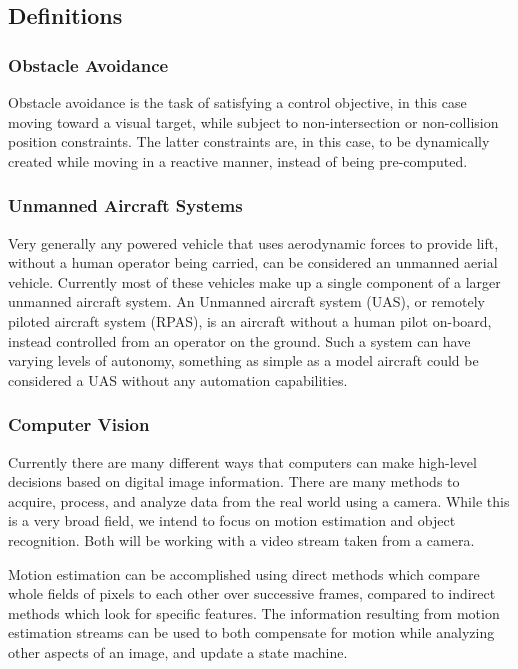 \documentclass{article}[12]
\begin{document}
	\subsection{Definitions}
	
		\subsubsection{Obstacle Avoidance}
		
		Obstacle avoidance is the task of satisfying a control objective, in this case moving toward a visual target, while subject to non-intersection or non-collision position constraints. The latter constraints are, in this case, to be dynamically created while moving in a reactive manner, instead of being pre-computed.
		
		\subsubsection{Unmanned Aircraft Systems}
		
		Very generally any powered vehicle that uses aerodynamic forces to provide lift, without a human operator being carried, can be considered an unmanned aerial vehicle. Currently most of these vehicles make up a single component of a larger unmanned aircraft system. An Unmanned aircraft system (UAS), or remotely piloted aircraft system (RPAS), is an aircraft without a human pilot on-board, instead controlled from an operator on the ground. Such a system can have varying levels of autonomy, something as simple as a model aircraft could be considered a UAS without any automation capabilities.\cite{RPAS}
		
		\subsubsection{Computer Vision}
		
		Currently there are many different ways that computers can make high-level decisions based on digital image information. There are many methods to acquire, process, and analyze data from the real world using a camera. While this is a very broad field, we intend to focus on motion estimation and object recognition. Both will be working with a video stream taken from a camera. 
		
		Motion estimation can be accomplished using direct methods which compare whole fields of pixels to each other over successive frames, compared to indirect methods which look for specific features. The information resulting from motion estimation streams can be used to both compensate for motion while analyzing other aspects of an image, and update a state machine.
		
\end{document}
